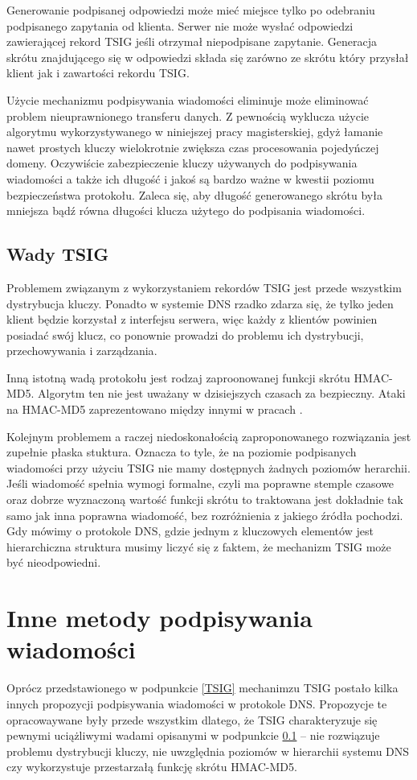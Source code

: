 Generowanie podpisanej odpowiedzi może mieć miejsce tylko po odebraniu podpisanego zapytania od klienta. Serwer nie może wysłać odpowiedzi zawierającej rekord TSIG jeśli otrzymał niepodpisane zapytanie. Generacja skrótu znajdującego się w odpowiedzi składa się zarówno ze skrótu który przysłał klient jak i zawartości rekordu TSIG\cite{nask-tsig}.

Użycie mechanizmu podpisywania wiadomości eliminuje może eliminować problem nieuprawnionego transferu danych. Z pewnością wyklucza użycie algorytmu wykorzystywanego w niniejszej pracy magisterskiej, gdyż łamanie nawet prostych kluczy wielokrotnie zwiększa czas procesowania pojedyńczej domeny\cite{nask-tsig}. Oczywiście zabezpieczenie kluczy używanych do podpisywania wiadomości a także ich długość i jakoś są bardzo ważne w kwestii poziomu bezpieczeństwa protokołu. Zaleca się, aby długość generowanego skrótu była mniejsza bądź równa długości klucza użytego do podpisania wiadomości.

\subsection{Wady TSIG}\label{wady-tsig}
Problemem związanym z wykorzystaniem rekordów TSIG jest przede wszystkim dystrybucja kluczy. Ponadto w systemie DNS rzadko zdarza się, że tylko jeden klient będzie korzystał z interfejsu serwera, więc każdy z klientów powinien posiadać swój klucz, co ponownie prowadzi do problemu ich dystrybucji, przechowywania i zarządzania\cite{nask-tsig}. 

Inną istotną wadą protokołu jest rodzaj zaproonowanej funkcji skrótu HMAC-MD5. Algorytm ten nie jest uważany w dzisiejszych czasach za bezpieczny. Ataki na HMAC-MD5 zaprezentowano między innymi w pracach \cite{hmac-md5-attack, hmac-md5-cryptoanalisys}. 

Kolejnym problemem a raczej niedoskonałością zaproponowanego rozwiązania jest zupełnie płaska stuktura. Oznacza to tyle, że na poziomie podpisanych wiadomości przy użyciu TSIG nie mamy dostępnych żadnych poziomów herarchii. Jeśli wiadomość spełnia wymogi formalne, czyli ma poprawne stemple czasowe oraz dobrze wyznaczoną wartość funkcji skrótu to traktowana jest dokładnie tak samo jak inna poprawna wiadomość, bez rozróżnienia z jakiego źródła pochodzi. Gdy mówimy o protokole DNS, gdzie jednym z kluczowych elementów jest hierarchiczna struktura musimy liczyć się z faktem, że mechanizm TSIG może być nieodpowiedni.

\section{Inne metody podpisywania wiadomości}
Oprócz przedstawionego w podpunkcie \ref{TSIG} mechanimzu TSIG postało kilka innych propozycji podpisywania wiadomości w protokole DNS. Propozycje te opracowaywane były przede wszystkim dlatego, że TSIG charakteryzuje się pewnymi uciążliwymi wadami opisanymi w podpunkcie \ref{wady-tsig} -- nie rozwiązuje problemu dystrybucji kluczy, nie uwzględnia poziomów w hierarchii systemu DNS czy wykorzystuje przestarzałą funkcję skrótu HMAC-MD5.


